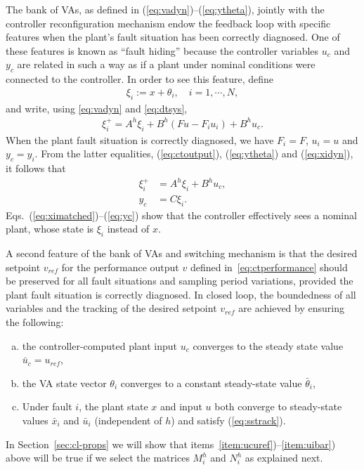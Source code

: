 \documentclass[letterpaper, 10 pt, conference]{ieeeconf}
\newcommand{\dfn}{:=}
\begin{document}
The bank of VAs, as defined in (\ref{eq:vadyn})--(\ref{eq:ytheta}),
jointly with the controller reconfiguration mechanism endow the
feedback loop with specific features when the plant's fault situation
has been correctly diagnosed. One of these features is known as
``fault hiding'' because the controller variables $u_c$ and $y_c$ are
related in such a way as if a plant under nominal conditions were
connected to the controller.  In order to see this feature, define
\begin{align}
  \label{eq:xidef}
  \xi_i \dfn x+ \theta_i, \quad i = 1,\cdots,N,
\end{align}
and write, using \eqref{eq:vadyn} and \eqref{eq:dtsys},
\begin{align}
  \label{eq:xidyn}
  \xi _i^+ = A^h\xi _i+B^h(Fu-F_iu_i)+ B^hu_c.
\end{align}
When the plant fault situation is correctly diagnosed, we have
$F_i=F$, $u_i=u$ and $y_c = y_i$. From the latter equalities,
(\ref{eq:ctoutput}), (\ref{eq:ytheta}) and (\ref{eq:xidyn}), it
follows that
\begin{align}
  \label{eq:ximatched}
  \xi _i^+ &= A^h\xi _i+ B^hu_c,\\
  \label{eq:yc}
  y_c &= C\xi_i. \end{align}
Eqs.~(\ref{eq:ximatched})--(\ref{eq:yc}) show that the controller
effectively sees a nominal plant, whose state is $\xi_i$ instead of
$x$.

A second feature of the bank of VAs and switching mechanism is that
the desired setpoint $v_{ref}$ for the performance output $v$ defined
in~\eqref{eq:ctperformance} should be preserved for all fault
situations and sampling period variations, provided the plant fault
situation is correctly diagnosed. In closed loop, the boundedness of
all variables and the tracking of the desired setpoint $v_{ref}$ are
achieved by ensuring the following:
\begin{enumerate}[a)]
\item the controller-computed plant input $u_c$ converges to the
  steady state value $\bar u_c = u_{ref}$, \label{item:ucuref}
\item the VA state vector $\theta_i$ converges to a constant
  steady-state value $\bar\theta_i$, \label{item:xthetass}
\item Under fault $i$, the plant state $x$ and input $u$ both converge to steady-state values $\bar x_i$ and $\bar u_i$ (independent of $h$) and satisfy  (\ref{eq:sstrack}).\label{item:uibar}
\end{enumerate}
In Section~\ref{sec:cl-props} we will show that
items~\ref{item:ucuref})--\ref{item:uibar}) above will be true if we
select the matrices $M_i^h$ and $N_i^h$ as explained next.
\end{document}
